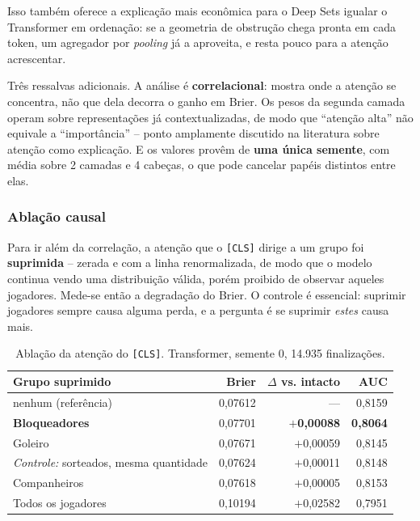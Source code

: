 \documentclass[12pt]{article}
\begin{document}
Isso também oferece a explicação mais econômica para o Deep Sets igualar o
Transformer em ordenação: se a geometria de obstrução chega pronta em cada token,
um agregador por \emph{pooling} já a aproveita, e resta pouco para a atenção
acrescentar.

Três ressalvas adicionais. A análise é \textbf{correlacional}: mostra onde a
atenção se concentra, não que dela decorra o ganho em Brier. Os pesos da segunda
camada operam sobre representações já contextualizadas, de modo que ``atenção
alta'' não equivale a ``importância'' -- ponto amplamente discutido na literatura
sobre atenção como explicação. E os valores provêm de \textbf{uma única semente},
com média sobre 2 camadas e 4 cabeças, o que pode cancelar papéis distintos entre
elas.

\subsubsection*{Ablação causal}

Para ir além da correlação, a atenção que o \texttt{[CLS]} dirige a um grupo foi
\textbf{suprimida} -- zerada e com a linha renormalizada, de modo que o modelo
continua vendo uma distribuição válida, porém proibido de observar aqueles
jogadores. Mede-se então a degradação do Brier. O controle é essencial: suprimir
jogadores sempre causa alguma perda, e a pergunta é se suprimir \emph{estes}
causa mais.

\begin{table}[ht]
\centering
\caption{Ablação da atenção do \texttt{[CLS]}. Transformer, semente 0,
14.935 finalizações.}
\label{tab:ablacao}
\begin{tabular}{@{}lrrr@{}}
\toprule
Grupo suprimido & Brier & $\Delta$ vs. intacto & AUC \\
\midrule
nenhum (referência) & 0,07612 & --- & 0,8159 \\
\textbf{Bloqueadores} & 0,07701 & \textbf{$+$0,00088} & \textbf{0,8064} \\
Goleiro & 0,07671 & $+$0,00059 & 0,8145 \\
\emph{Controle:} sorteados, mesma quantidade & 0,07624 & $+$0,00011 & 0,8148 \\
Companheiros & 0,07618 & $+$0,00005 & 0,8153 \\
Todos os jogadores & 0,10194 & $+$0,02582 & 0,7951 \\
\bottomrule
\end{tabular}
\end{table}
\end{document}
